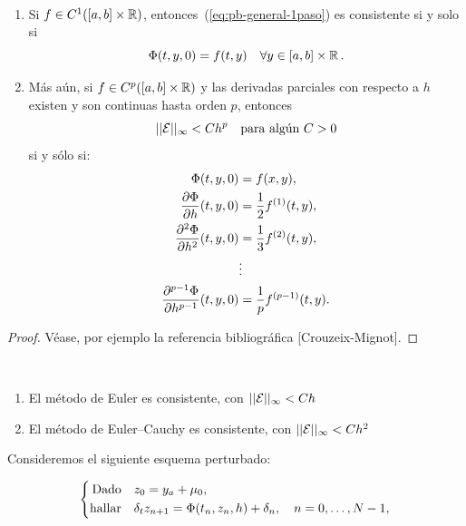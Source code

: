 \begin{theorem}[Consistencia]~
  \label{thm:consitencia-pb-general-1paso}
  \begin{enumerate}
  \item Si $f\in C^1([\ta,\tb]\times\Rset)$,
    entonces~(\ref{eq:pb-general-1paso}) es consistente si y solo si 
    \begin{equation*}
      \Phi(t,y,0) = f(t,y)\quad \forall y\in[\ta,\tb]\times\Rset.
    \end{equation*}
  \item Más aún, si $f\in C^p([\ta,\tb]\times\Rset)$ y las derivadas
    parciales con respecto a $h$ existen y son continuas hasta orden
    $p$, entonces
    $$ ||{\cal E}||_\infty<C h^p \quad \text{para algún $C>0$}$$
    si y sólo si:
    \begin{align*}
      \Phi(t,y,0) &= f(x,y), \\
      \frac{\partial\Phi}{\partial h}(t,y,0) &=
      \frac{1}{2}\Dtotal1 f(t,y),
      \\
      \frac{\partial^2\Phi}{\partial h^2}(t,y,0) &=
      \frac{1}{3}\Dtotal2 f(t,y),
      \\
      &\vdots
      \\
      \frac{\partial^{p-1}\Phi}{\partial h^{p-1}}(t,y,0) &=
      \frac{1}{p} \Dtotal{p-1} f(t,y).
    \end{align*}
  \end{enumerate}
\end{theorem}

\begin{proof}
  Véase, por ejemplo la referencia bibliográfica
  [Crouzeix-Mignot].
\end{proof}

\begin{example}~
  \begin{enumerate}
  \item 
    El método de Euler es consistente, con  $ ||{\cal E}||_\infty<C h $
  \item El método de Euler--Cauchy es consistente, con $ ||{\cal
      E}||_\infty<C h^2 $
  \end{enumerate}
\end{example}

Consideremos el siguiente esquema perturbado:

\begin{equation}
  \label{eq:pb-perturbado-general-1paso} 
  \left\{
  \begin{aligned}
    \text{Dado}\quad &z_0 = \ycero+\mu_0,\\
    \text{hallar}\quad &\ddt z_{n+1} = \Phi(\tn,z_n, h) + \delta_n, \quad
    n=0,\dots, N-1,
  \end{aligned}
  \right.
\end{equation}

